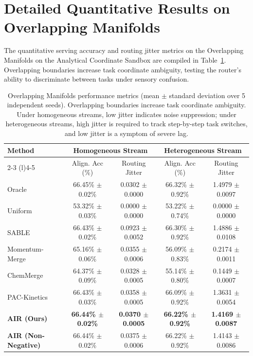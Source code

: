 \documentclass{article}
\theoremstyle{plain}
\theoremstyle{definition}
\theoremstyle{remark}
\begin{document}
\section{Detailed Quantitative Results on Overlapping Manifolds}
\label{app:overlapping_results}

The quantitative serving accuracy and routing jitter metrics on the Overlapping Manifolds on the Analytical Coordinate Sandbox are compiled in Table~\ref{tab:overlapping_results}. Overlapping boundaries increase task coordinate ambiguity, testing the router's ability to discriminate between tasks under sensory confusion.

\begin{table}[H]
\caption{Overlapping Manifolds performance metrics (mean $\pm$ standard deviation over 5 independent seeds). Overlapping boundaries increase task coordinate ambiguity. Under homogeneous streams, low jitter indicates noise suppression; under heterogeneous streams, high jitter is required to track step-by-step task switches, and low jitter is a symptom of severe lag.}
\label{tab:overlapping_results}
\vskip 0.1in
\begin{center}
\begin{small}
\begin{sc}
\setlength{\tabcolsep}{2pt}
\begin{tabular}{lcccc}
\toprule
Method & \multicolumn{2}{c}{Homogeneous Stream} & \multicolumn{2}{c}{Heterogeneous Stream} \\
\cmidrule(r){2-3} \cmidrule(l){4-5}
& Align. Acc (\%) & Routing Jitter & Align. Acc (\%) & Routing Jitter \\
\midrule
Oracle & 66.45\% $\pm$ 0.02\% & 0.0302 $\pm$ 0.0000 & 66.32\% $\pm$ 0.92\% & 1.4979 $\pm$ 0.0097 \\
Uniform & 53.32\% $\pm$ 0.03\% & 0.0000 $\pm$ 0.0000 & 53.22\% $\pm$ 0.74\% & 0.0000 $\pm$ 0.0000 \\
SABLE \cite{sable2024} & 66.43\% $\pm$ 0.02\% & 0.0923 $\pm$ 0.0052 & 66.30\% $\pm$ 0.92\% & 1.4886 $\pm$ 0.0108 \\
Momentum-Merge \cite{momentummerge2025} & 65.16\% $\pm$ 0.06\% & 0.0355 $\pm$ 0.0006 & 56.09\% $\pm$ 0.83\% & 0.2174 $\pm$ 0.0011 \\
ChemMerge \cite{chemmerge2025} & 64.37\% $\pm$ 0.09\% & 0.0328 $\pm$ 0.0005 & 55.14\% $\pm$ 0.80\% & 0.1449 $\pm$ 0.0007 \\
PAC-Kinetics \cite{packinetics2025} & 66.43\% $\pm$ 0.03\% & 0.0358 $\pm$ 0.0005 & 66.09\% $\pm$ 0.92\% & 1.3631 $\pm$ 0.0054 \\
\midrule
\textbf{AIR (Ours)} & \textbf{66.44\% $\pm$ 0.02\%} & \textbf{0.0370 $\pm$ 0.0005} & \textbf{66.22\% $\pm$ 0.92\%} & \textbf{1.4169 $\pm$ 0.0087} \\
\textbf{AIR (Non-Negative)} & 66.44\% $\pm$ 0.02\% & 0.0375 $\pm$ 0.0006 & 66.22\% $\pm$ 0.92\% & 1.4143 $\pm$ 0.0086 \\
\bottomrule
\end{tabular}
\end{sc}
\end{small}
\end{center}
\vskip -0.1in
\end{table}
\end{document}

